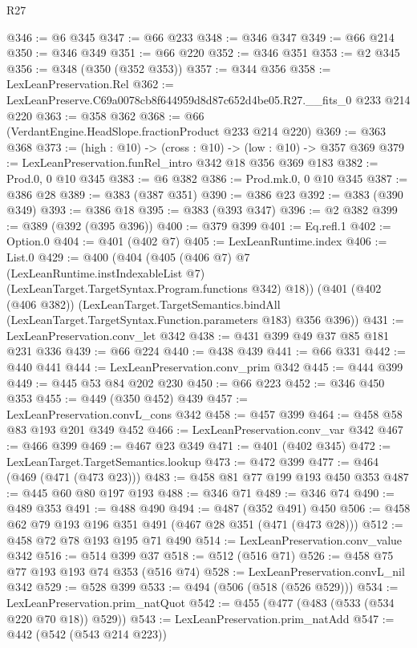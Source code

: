 \begin{lexlean}{R27}
\begin{coremodule}
@346 := @6 @345
@347 := @66 @233
@348 := @346 @347
@349 := @66 @214
@350 := @346 @349
@351 := @66 @220
@352 := @346 @351
@353 := @2 @345
@356 := @348 (@350 (@352 @353))
@357 := @344 @356
@358 := LexLeanPreservation.Rel
@362 := LexLeanPreserve.C69a0078cb8f644959d8d87c652d4be05.R27.__fits_0 @233 @214 @220
@363 := @358 @362
@368 := @66 (VerdantEngine.HeadSlope.fractionProduct @233 @214 @220)
@369 := @363 @368
@373 := (high : @10) -> (cross : @10) -> (low : @10) -> @357 @369
@379 := LexLeanPreservation.funRel_intro @342 @18 @356 @369 @183
@382 := Prod.{0, 0} @10 @345
@383 := @6 @382
@386 := Prod.mk.{0, 0} @10 @345
@387 := @386 @28
@389 := @383 (@387 @351)
@390 := @386 @23
@392 := @383 (@390 @349)
@393 := @386 @18
@395 := @383 (@393 @347)
@396 := @2 @382
@399 := @389 (@392 (@395 @396))
@400 := @379 @399
@401 := Eq.refl.{1}
@402 := Option.{0}
@404 := @401 (@402 @7)
@405 := LexLeanRuntime.index
@406 := List.{0}
@429 := @400
    (@404
      (@405
        (@406 @7)
        @7
        (LexLeanRuntime.instIndexableList @7)
        (LexLeanTarget.TargetSyntax.Program.functions @342)
        @18))
    (@401
      (@402 (@406 @382))
      (LexLeanTarget.TargetSemantics.bindAll
        (LexLeanTarget.TargetSyntax.Function.parameters @183)
        @356
        @396))
@431 := LexLeanPreservation.conv_let @342
@438 := @431 @399 @49 @37 @85 @181 @231 @336
@439 := @66 @224
@440 := @438 @439
@441 := @66 @331
@442 := @440 @441
@444 := LexLeanPreservation.conv_prim @342
@445 := @444 @399
@449 := @445 @53 @84 @202 @230
@450 := @66 @223
@452 := @346 @450 @353
@455 := @449 (@350 @452) @439
@457 := LexLeanPreservation.convL_cons @342
@458 := @457 @399
@464 := @458 @58 @83 @193 @201 @349 @452
@466 := LexLeanPreservation.conv_var @342
@467 := @466 @399
@469 := @467 @23 @349
@471 := @401 (@402 @345)
@472 := LexLeanTarget.TargetSemantics.lookup
@473 := @472 @399
@477 := @464 (@469 (@471 (@473 @23)))
@483 := @458 @81 @77 @199 @193 @450 @353
@487 := @445 @60 @80 @197 @193
@488 := @346 @71
@489 := @346 @74
@490 := @489 @353
@491 := @488 @490
@494 := @487 (@352 @491) @450
@506 := @458 @62 @79 @193 @196 @351 @491 (@467 @28 @351 (@471 (@473 @28)))
@512 := @458 @72 @78 @193 @195 @71 @490
@514 := LexLeanPreservation.conv_value @342
@516 := @514 @399 @37
@518 := @512 (@516 @71)
@526 := @458 @75 @77 @193 @193 @74 @353 (@516 @74)
@528 := LexLeanPreservation.convL_nil @342
@529 := @528 @399
@533 := @494 (@506 (@518 (@526 @529)))
@534 := LexLeanPreservation.prim_natQuot
@542 := @455 (@477 (@483 (@533 (@534 @220 @70 @18)) @529))
@543 := LexLeanPreservation.prim_natAdd
@547 := @442 (@542 (@543 @214 @223))

\end{coremodule}
\end{lexlean}

